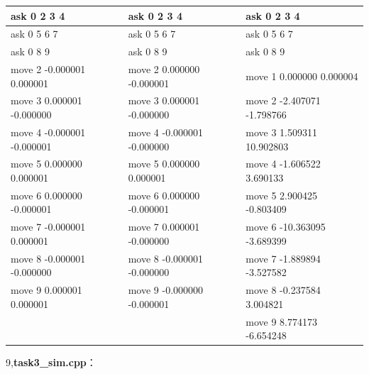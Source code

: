 \documentclass{ctexart}
\begin{document}
\begin{flushleft}
\begin{table}[H]
\begin{tabular}{|l|l|l|}
      ask 0 2 3 4 & ask 0 2 3 4 & ask 0 2 3 4 \\ \hline
      ask 0 5 6 7 & ask 0 5 6 7 & ask 0 5 6 7 \\ \hline
      ask 0 8 9 & ask 0 8 9 & ask 0 8 9 \\ \hline
      move 2 -0.000001 0.000001 & move 2 0.000000 -0.000001 & move 1 0.000000 0.000004 \\ \hline
      move 3 0.000001 -0.000000 & move 3 0.000001 -0.000000 & move 2 -2.407071 -1.798766 \\ \hline
      move 4 -0.000001 -0.000001 & move 4 -0.000001 -0.000000 & move 3 1.509311 10.902803 \\ \hline
      move 5 0.000000 0.000001 & move 5 0.000000 0.000001 & move 4 -1.606522 3.690133 \\ \hline
      move 6 0.000000 -0.000001 & move 6 0.000000 -0.000001 & move 5 2.900425 -0.803409 \\ \hline
      move 7 -0.000001 0.000001 & move 7 0.000001 -0.000000 & move 6 -10.363095 -3.689399 \\ \hline
      move 8 -0.000001 -0.000000 & move 8 -0.000001 -0.000000 & move 7 -1.889894 -3.527582 \\ \hline
      move 9 0.000001 0.000001 & move 9 -0.000000 -0.000001 & move 8 -0.237584 3.004821 \\ \hline
      ~ & ~ & move 9 8.774173 -6.654248 \\ \hline
  \end{tabular}
\end{table}

9,\textbf{task3\_sim.cpp}：



\end{flushleft}





  
\end{document}
